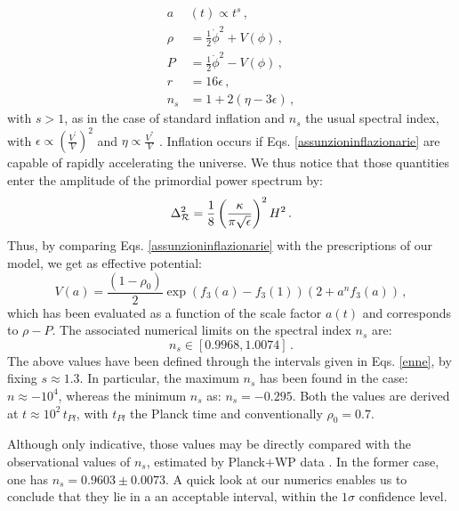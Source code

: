 \documentclass[nofootinbib,prd,superscriptaddress,showpacs,showkeys,]{revtex4}
\begin{document}
\begin{subequations}\label{assunzioninflazionarie}
\begin{align}
a&(t)\propto t^s\,,\label{uno1}\\
\rho&=\frac{1}{2}\dot \phi^2+V(\phi)\,,\label{uno2}\\
P&=\frac{1}{2}\dot \phi^2-V(\phi)\,,\label{uno3}\\
r&=16\epsilon\,,\label{uno5}\\
n_s&=1+2(\eta-3\epsilon)\,,\label{uno4}
\end{align}
\end{subequations}
with $s>1$, as in the case of standard inflation and $n_s$ the usual spectral index, with $\epsilon\propto \left(\frac{V^\prime}{V}\right)^2$ and $\eta\propto \frac{V^{''}}{V}$ \cite{inflazione1}. Inflation occurs if  Eqs. \eqref{assunzioninflazionarie} are capable of rapidly accelerating the universe. We thus notice that those quantities enter the amplitude of the primordial power spectrum \cite{inflazione2} by:
\begin{eqnarray}\label{uno6}
\Delta^2_{\cal R}=\frac{1}{8}\left(\frac{\kappa }{\pi \sqrt{\epsilon}}\right)^2H^2\,.
\end{eqnarray}
Thus, by comparing Eqs. \eqref{assunzioninflazionarie} with the prescriptions of our model, we get as effective potential:
\begin{equation}\label{qualcosa}
V(a)=\frac{(1-\rho_0)}{2}\exp(f_3(a)-f_3(1))\left(2+a^nf_3(a)\right)\,,
\end{equation}
which has been evaluated as a  function of the scale factor $a(t)$ and corresponds to $\rho-P$. The associated numerical limits on the spectral index $n_s$ are:
\begin{equation}
n_s\in[0.9968,1.0074]\,.\label{uno7}
\end{equation}
The above values have  been defined through the intervals given in Eqs. \eqref{enne}, by fixing $s\approx 1.3$. In particular, the maximum $n_s$ has been found in the case: $n\approx -10^4$, whereas the minimum $n_s$ as: $n_s=-0.295$. Both the values are derived at  $t\approx 10^2\,t_{Pl}$, with $t_{Pl}$ the Planck time and conventionally $\rho_0=0.7$.

Although only indicative, those values may be directly compared with the observational values of $n_s$, estimated by Planck$+$WP data \cite{Planckdata,Planck2015}. In the former case, one has $n_s=0.9603\pm0.0073$. A quick look at our numerics enables us to conclude that they lie in a an acceptable interval, within the $1\sigma$ confidence level.
\end{document}
